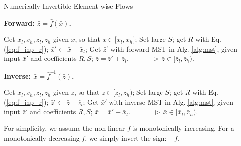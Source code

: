 \documentclass{article}
\newcommand{\quant}[1]{\bar{#1}}
\begin{document}
\begin{algorithm}[h]
\small
\caption{Numerically Invertible Element-wise Flows}
\begin{multicols}{2} 
\textbf{Forward: $\bar{z} = \bar{f} (\bar{x})$.} 

\begin{algorithmic}[1]
\STATE Get $\quant{x}_l, \quant{x}_h, \quant{z}_l, \quant{z}_h$ given $\quant{x}$, so that $\quant{x} \in [\quant{x}_l, \quant{x}_h)$;
\STATE Set large $S$; get $R$ with Eq. (\ref{eq:f_inp_r}); $\quant{x}' \gets \quant{x} - \quant{x}_l$;
\STATE Get $\quant{z}'$ with forward MST in Alg. \ref{alg:mst}, given input $\quant{x}'$ and coefficients $R, S$;
\RETURN $\quant{z} = \quant{z}' + \quant{z}_l$. $\qquad \quad \triangleright ~ \quant{z} \in [\quant{z}_l, \quant{z}_h).$
\end{algorithmic}

\textbf{Inverse: $\bar{x} = \bar{f}^{-1} (\bar{z})$.} 

\begin{algorithmic}[1]
\STATE Get $\quant{x}_l, \quant{x}_h, \quant{z}_l, \quant{z}_h$ given $\quant{z}$, so that $\quant{z} \in [\quant{z}_l, \quant{z}_h)$;
\STATE Set large $S$; get $R$ with Eq. (\ref{eq:f_inp_r}); $\quant{z}' \gets \quant{z} - \quant{z}_l$;
\STATE Get $\quant{x}'$ with inverse MST in Alg. \ref{alg:mst}, given input $\quant{z}'$ and coefficients $R, S$;
\RETURN $\quant{x} = \quant{x}' + \quant{x}_l$. $\qquad \quad \triangleright ~ \quant{x} \in [\quant{x}_l, \quant{x}_h).$
\end{algorithmic}
\end{multicols}
\vspace{-8pt}
\label{alg:ni_eleflow}
\end{algorithm}



For simplicity, we assume the non-linear $f$ is monotonically increasing. For a monotonically decreasing $f$, we simply invert the sign: $-f$.
\end{document}

